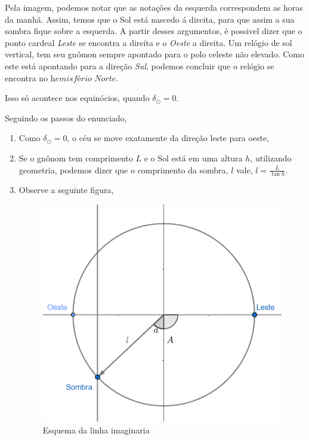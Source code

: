 \documentclass[11pt]{article}
\begin{document}
\begin{pproblem}
    
    \begin{pssolution*}{}{}
        \begin{alternativas}
            \item Pela imagem, podemos notar que as notações da esquerda correspondem as horas da manhã. Assim, temos que o Sol está nascedo á direita, para que assim a sua sombra fique sobre a esquerda. A partir desses argumentos, é possivel dizer que o ponto cardeal \textit{Leste} se encontra a direita e o \textit{Oeste} a direita. Um relógio de sol vertical, tem seu gnômon sempre apontado para o polo celeste não elevado. Como este está apontando para a direção \textit{Sul}, podemos concluir que o relógio se encontra no \(\boxed{\textit{hemisfério Norte}}\).
          
            \item Isso só acontece nos equinócios, quando \(\delta_\odot = 0\).
            
            \item Seguindo os passos do enunciado, 
            \begin{enumerate}[label=\roman*)]
                \item Como \(\delta_\odot=0\), o céu se move exatamente da direção leste para oeste, 
                \item Se o gnônom tem comprimento \(L\) e o Sol está em uma altura \(h\), utilizando geometria, podemos dizer que o comprimento da sombra, \(l\) vale, \(l=\frac{L}{\tan h}\).
                \item Observe a seguinte figura, 
                \begin{figure}[H]
                    \centering
                    \includegraphics[width=0.66\linewidth]{imagens/retarelogiosolvert.png}
                    \caption{Esquema da linha imaginaria}
                \end{figure}
            \end{enumerate}
            

\end{alternativas}
\end{pssolution*}
\end{pproblem}
\end{document}
